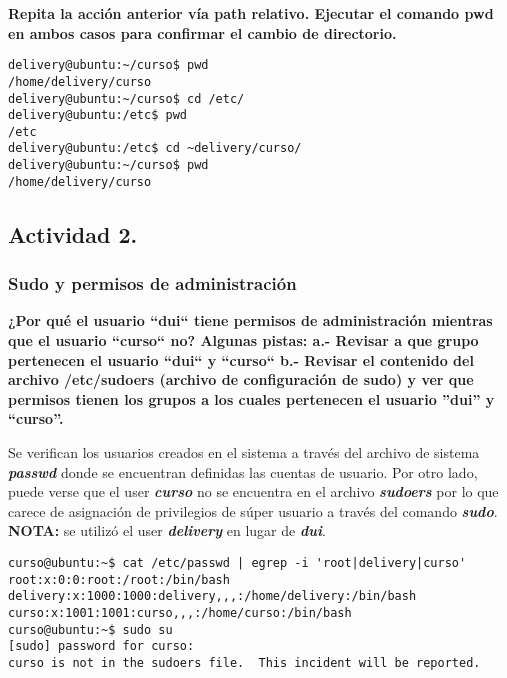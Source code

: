 \documentclass[a4paper,11pt,spanish]{article} %
\newenvironment{myscriptlisting}
{\begin{list}{}{\setlength{\leftmargin}{1em}}\item\scriptsize\bfseries}
{\end{list}}
\begin{document}
\textbf{Repita la acción anterior vía path relativo.
Ejecutar el comando pwd en ambos casos para confirmar el cambio de directorio.}

\begin{myscriptlisting}
  \begin{verbatim}
delivery@ubuntu:~/curso$ pwd
/home/delivery/curso
delivery@ubuntu:~/curso$ cd /etc/
delivery@ubuntu:/etc$ pwd
/etc
delivery@ubuntu:/etc$ cd ~delivery/curso/
delivery@ubuntu:~/curso$ pwd
/home/delivery/curso
  \end{verbatim}
\end{myscriptlisting}

\subsection{Actividad 2.}

\subsubsection{Sudo y permisos de administración}
\textbf{¿Por qué el usuario ``dui`` tiene permisos de administración mientras que el usuario ``curso`` no? 
Algunas pistas:
a.- Revisar a que grupo pertenecen el usuario ``dui`` y ``curso``
b.- Revisar el contenido del archivo /etc/sudoers (archivo de configuración de \ac{sudo})
y ver que permisos tienen los grupos a los cuales pertenecen el usuario ''dui'' y ``curso''.\\}

Se verifican los usuarios creados en el sistema a través del archivo de sistema \textbf{\emph{passwd}} 
donde se encuentran definidas las cuentas de usuario.
Por otro lado, puede verse que el user \textbf{\emph{curso}} no se encuentra en el archivo
\textbf{\emph{sudoers}} por lo que carece de asignación de privilegios de súper usuario a través
del comando \textbf{\emph{\ac{sudo}}}.\\ 

\textbf{NOTA:}
se utilizó el user \textbf{\emph{delivery}} en lugar de \textbf{\emph{dui}}.

\begin{myscriptlisting}
  \begin{verbatim}
curso@ubuntu:~$ cat /etc/passwd | egrep -i 'root|delivery|curso'
root:x:0:0:root:/root:/bin/bash
delivery:x:1000:1000:delivery,,,:/home/delivery:/bin/bash
curso:x:1001:1001:curso,,,:/home/curso:/bin/bash
curso@ubuntu:~$ sudo su
[sudo] password for curso: 
curso is not in the sudoers file.  This incident will be reported.
  \end{verbatim}
\end{myscriptlisting}
\end{document}
